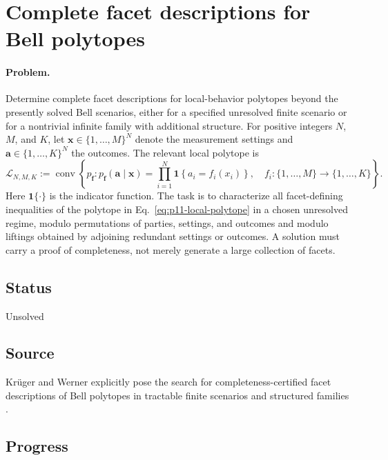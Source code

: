 \section{Complete facet descriptions for Bell polytopes}
\label{sec:problem-11}

\paragraph{Problem.}
Determine complete facet descriptions for local-behavior polytopes beyond the
presently solved Bell scenarios, either for a specified unresolved finite
scenario or for a nontrivial infinite family with additional structure.  For
positive integers $N$, $M$, and $K$, let
$\mathbf{x}\in\{1,\ldots,M\}^{N}$ denote the measurement settings and
$\mathbf{a}\in\{1,\ldots,K\}^{N}$ the outcomes.  The relevant local polytope
is
\begin{equation}
  \mathcal{L}_{N,M,K}
  :=\operatorname{conv}\!\left\{
    p_{\mathbf f}:p_{\mathbf f}(\mathbf a\mid\mathbf x)
    =\prod_{i=1}^{N}\mathbf{1}\!\left\{a_i=f_i(x_i)\right\},\quad
    f_i:\{1,\ldots,M\}\to\{1,\ldots,K\}
  \right\}.
  \label{eq:p11-local-polytope}
\end{equation}
Here $\mathbf 1\{\cdot\}$ is the indicator function.
The task is to characterize all facet-defining inequalities of the polytope
in Eq.~\eqref{eq:p11-local-polytope} in a chosen unresolved regime, modulo
permutations of parties, settings, and outcomes and modulo liftings obtained
by adjoining redundant settings or outcomes.  A solution must carry a proof
of completeness, not merely generate a large collection of facets.

\subsection*{Status}

Unsolved

\subsection*{Source}

Kr\"uger and Werner explicitly pose the search for completeness-certified
facet descriptions of Bell polytopes in tractable finite scenarios and
structured families .

\subsection*{Progress}

